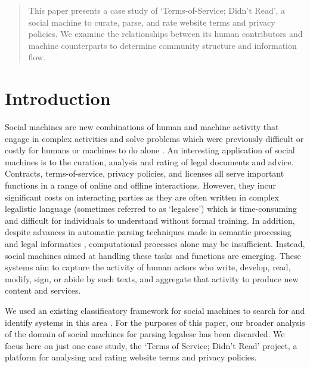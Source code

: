 \documentclass{sig-alternate-2013}
\begin{document}
\maketitle
\begin{abstract}

This paper presents a case study of `Terms-of-Service; Didn't Read', a social machine to curate, parse, and rate website terms and privacy policies. We examine the relationships between its human contributors and machine counterparts to determine community structure and information flow.

\end{abstract}



\section{Introduction}

Social machines are new combinations of human and machine activity that engage in complex activities and solve problems which were previously difficult or costly for humans or machines to do alone \cite{shadbolt:classif}. An interesting application of social machines is to the curation, analysis and rating of legal documents and advice. Contracts, terms-of-service, privacy policies, and licenses all serve important functions in a range of online and offline interactions. However, they incur significant costs on interacting parties as they are often written in complex legalistic language (sometimes referred to as `legalese') which is time-consuming and difficult for individuals to understand without formal training. In addition, despite advances in automatic parsing techniques made in semantic processing and legal informatics \cite{franc:semantic, spinosa:nlp}, computational processes alone may be insufficient. Instead, social machines aimed at handling these tasks and functions are emerging. These systems aim to capture the activity of human actors who write, develop, read, modify, sign, or abide by such texts, and aggregate that activity to produce new content and services.

We used an existing classificatory framework for social machines to search for and identify systems in this area \cite{shadbolt:classif}. For the purposes of this paper, our broader analysis of the domain of social machines for parsing legalese has been discarded. We focus here on just one case study, the `Terms of Service; Didn't Read' project, a platform for analysing and rating website terms and privacy policies.
\end{document}

